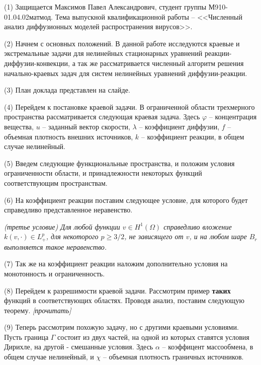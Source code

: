 \documentclass[14pt, a4paper]{extarticle}
\begin{document}
	(1) Защищается Максимов Павел Александрович, студент группы М910-01.04.02матмод. Тема выпускной квалификационной работы -- <<Численный анализ диффузионных моделей распространения вирусов>>.

	(2) Начнем с основных положений. В данной работе исследуются краевые и экстремальные задачи для нелинейных стационарных уравнений реакции-диффузии-конвекции, а так же рассматривается численный алгоритм решения начально-краевых задач для систем нелинейных уравнений диффузии-реакции.

	(3) План доклада представлен на слайде.

	(4) Перейдем к постановке краевой задачи. В ограниченной области трехмерного пространства рассматривается следующая краевая задача. Здесь $\varphi$ -- концентрация вещества, $u$ -- заданный вектор скорости, $\lambda$ -- коэффициент диффузии, $f$ -- объемная плотность внешних источников, $k$ -- коэффициент реакции, в общем случае нелинейный.

	(5) Введем следующие функциональные пространства, и положим условия ограниченности области, и принадлежности некоторых функций соответствующим пространствам.

	(6) На коэффициент реакции поставим следующее условие, для которого будет справедливо представленное неравенство.

	\textit{\small (третье условие) Для любой функции $v \in H^1(\Omega)$ справедливо вложение $k(v, \cdot) \in L^{p}_{+}$, для некоторого $p \ge 3/2$, не зависящего от $v$, и на любом шаре $B_r$ выполняется такое неравенство.}

	(7) Так же на коэффициент реакции наложим дополнительно условия на монотонность и ограниченность. 

	(8) Перейдем к разрешимости краевой задачи. Рассмотрим пример \textbf{таких} функций в соответствующих областях. Проводя анализ, поставим следующую теорему. \textit{[прочитать]} %

	(9) Теперь рассмотрим похожую задачу, но с другими краевыми условиями. Пусть граница $\Gamma$ состоит из двух частей, на одной из которых ставятся условия Дирихле, на другой - смешанные условия. Здесь $\alpha$ -- коэффицент массообмена, в общем случае нелинейный, и $\chi$ -- объемная плотность граничных источников.
\end{document}
